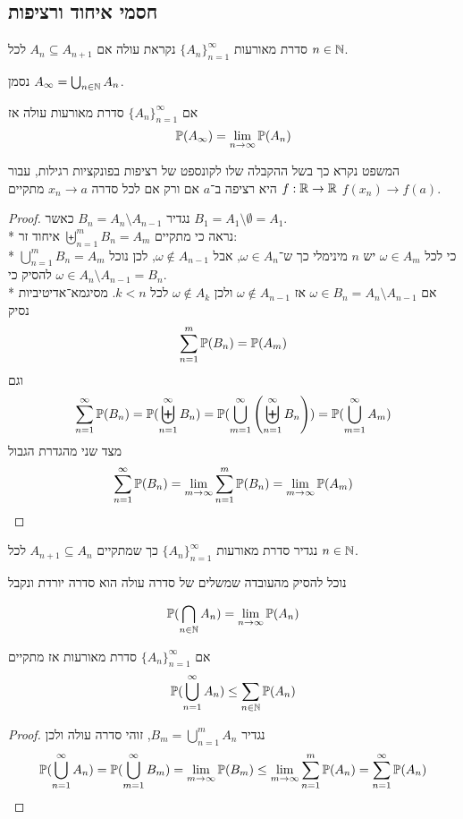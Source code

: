 \subsection{חסמי איחוד ורציפות}
\begin{definition}
	סדרת מאורעות ${\{A_n\}}_{n = 1}^\infty$ נקראת עולה אם $A_n \subseteq A_{n + 1}$ לכל $n \in \mathbb{N}$.
\end{definition}
\begin{notation}
	נסמן $A_\infty = \bigcup_{n \in \mathbb{N}} A_n$.
\end{notation}
\begin{theorem}\label{probability_continuous_probability_function_theorem}
	אם ${\{A_n\}}_{n = 1}^\infty$ סדרת מאורעות עולה אז
	\[
		\mathbb{P}(A_\infty) = \lim_{n \to \infty} \mathbb{P}(A_n)
	\]
\end{theorem}
המשפט נקרא כך בשל ההקבלה שלו לקונספט של רציפות בפונקציות רגילות, עבור $f : \mathbb{R} \to \mathbb{R}$ היא רציפה ב־$a$ אם ורק אם לכל סדרה $x_n \to a$ מתקיים $f(x_n) \to f(a)$.
\begin{proof}
	נגדיר $B_n = A_n \setminus A_{n - 1}$ כאשר $B_1 = A_1 \setminus \emptyset = A_1$. \\*
	נראה כי מתקיים $\biguplus_{n = 1}^m B_n = A_m$ איחוד זר: \\*
	$\bigcup_{n = 1}^m B_n = A_m$ כי לכל $\omega \in A_m$ יש $n$ מינימלי כך ש־$\omega \in A_n$, אבל $\omega \notin A_{n - 1}$, לכן נוכל להסיק כי $\omega \in A_n \setminus A_{n - 1} = B_n$. \\*
	אם $\omega \in B_n = A_n \setminus A_{n - 1}$ אז $\omega \notin A_{n - 1}$ ולכן $\omega \notin A_k$ לכל $k < n$.
	מסיגמא־אדיטיביות נסיק
	\[
		\sum_{n = 1}^{m} \mathbb{P}(B_n) = \mathbb{P}(A_m)
	\]
	וגם
	\[
		\sum_{n = 1}^{\infty} \mathbb{P}(B_n)
		= \mathbb{P}(\biguplus_{n = 1}^\infty B_n)
		= \mathbb{P}(\bigcup_{m = 1}^\infty \left(\biguplus_{n = 1}^\infty B_n\right))
		= \mathbb{P}(\bigcup_{m = 1}^\infty A_m)
	\]
	מצד שני מהגדרת הגבול
	\[
		\sum_{n = 1}^{\infty} \mathbb{P}(B_n)
		= \lim_{m \to \infty} \sum_{n = 1}^{m}  \mathbb{P}(B_n)
		= \lim_{m \to \infty} \mathbb{P}(A_m)
	\]
\end{proof}
\begin{definition}
	נגדיר סדרת מאורעות ${\{A_n\}}_{n = 1}^\infty$ כך שמתקיים $A_{n + 1} \subseteq A_n$ לכל $n \in \mathbb{N}$.
\end{definition}
נוכל להסיק מהעובדה שמשלים של סדרה עולה הוא סדרה יורדת ונקבל
\begin{proposition}
	\[
		\mathbb{P}(\bigcap_{n \in \mathbb{N}} A_n) = \lim_{n \to \infty} \mathbb{P}(A_n)
	\]
\end{proposition}
\begin{proposition}
	אם ${\{A_n\}}_{n = 1}^\infty$ סדרת מאורעות אז מתקיים
	\[
		\mathbb{P}(\bigcup_{n = 1}^\infty A_n) \le \sum_{n \in \mathbb{N}} \mathbb{P}(A_n)
	\]
\end{proposition}
\begin{proof}
	נגדיר $B_m = \bigcup_{n = 1}^m A_n$, זוהי סדרה עולה ולכן
	\[
		\mathbb{P}(\bigcup_{n = 1}^\infty A_n)
		= \mathbb{P}(\bigcup_{m = 1}^\infty B_m)
		= \lim_{m \to \infty} \mathbb{P}(B_m)
		\le \lim_{m \to \infty} \sum_{n = 1}^{m} \mathbb{P}(A_n)
		= \sum_{n = 1}^{\infty} \mathbb{P}(A_n)
	\]
\end{proof}

